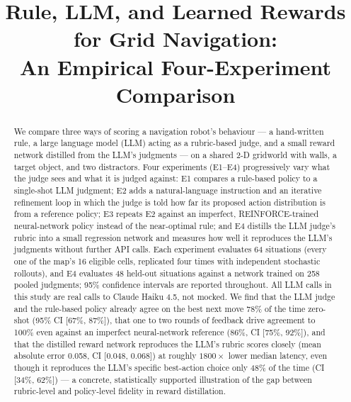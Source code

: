 \documentclass[10pt,conference]{IEEEtran}
\begin{document}
\title{Rule, LLM, and Learned Rewards for Grid Navigation: \\
An Empirical Four-Experiment Comparison}

\author{
\and
{}
}

\maketitle

\begin{abstract}
We compare three ways of scoring a navigation robot's behaviour --- a
hand-written rule, a large language model (LLM) acting as a rubric-based
judge, and a small reward network distilled from the LLM's judgments ---
on a shared 2-D gridworld with walls, a target object, and two
distractors. Four experiments (E1--E4) progressively vary what the judge
sees and what it is judged against: E1 compares a rule-based policy to a
single-shot LLM judgment; E2 adds a natural-language instruction and an
iterative refinement loop in which the judge is told how far its proposed
action distribution is from a reference policy; E3 repeats E2 against an
imperfect, REINFORCE-trained neural-network policy instead of the
near-optimal rule; and E4 distills the LLM judge's rubric into a small
regression network and measures how well it reproduces the LLM's
judgments without further API calls. Each experiment evaluates 64
situations (every one of the map's 16 eligible cells, replicated four
times with independent stochastic rollouts), and E4 evaluates 48
held-out situations against a network trained on 258 pooled judgments;
95\% confidence intervals are reported throughout. All LLM calls in this
study are real calls to Claude Haiku 4.5, not mocked. We find that the
LLM judge and the rule-based policy already agree on the best next move
78\% of the time zero-shot (95\% CI [67\%, 87\%]), that one to two
rounds of feedback drive agreement to 100\% even against an imperfect
neural-network reference (86\%, CI [75\%, 92\%]), and that the distilled
reward network reproduces the LLM's rubric scores closely (mean absolute
error 0.058, CI [0.048, 0.068]) at roughly $1800\times$ lower median
latency, even though it reproduces the LLM's specific best-action choice
only 48\% of the time (CI [34\%, 62\%]) --- a concrete, statistically
supported illustration of the gap between rubric-level and policy-level
fidelity in reward distillation.
\end{abstract}
\end{document}
